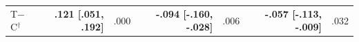 \documentclass[letterpaper]{article} %
\begin{document}
\begin{table}[t!]
\begin{tabular}{@{}l rr rr rr@{}}
T$-$C\(^{\dagger}\) & \textbf{.121 [.051, .192]} & .000 & \textbf{-.094 [-.160, -.028]} & .006 & \textbf{-.057 [-.113, -.009]} & .032\\ %

\end{tabular}
\end{table}
\end{document}
